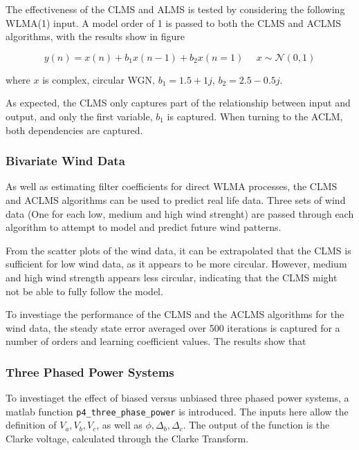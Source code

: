 \documentclass[main.tex]{subfiles}
\begin{document}
The effectiveness of the CLMS and ALMS is tested by considering the following WLMA(1) input. A model order of 1 is passed to both the CLMS and ACLMS algorithms, with the results show in figure %

\begin{equation}
y(n) = x(n) + b_1x(n-1) + b_2x(n=1)\ \ \ \ \ \ x \sim \mathcal{N}(0,1)
\end{equation}

where $x$ is complex, circular WGN, $b_1 = 1.5+1j$, $b_2  = 2.5-0.5j$.


As expected, the CLMS only captures part of the relationship between input and output, and only the first variable, $b_1$ is captured. When turning to the ACLM, both dependencies are captured.

\subsubsection{Bivariate Wind Data}

As well as estimating filter coefficients for direct WLMA processes, the CLMS and ACLMS algorithms can be used to predict real life data. Three sets of wind data (One for each low, medium and high wind strenght) are passed through each algorithm to attempt to model and predict future wind patterns.


From the scatter plots of the wind data, it can be extrapolated that the CLMS is sufficient for low wind data, as it appears to be more circular. However, medium and high wind strength appears less circular, indicating that the CLMS might not be able to fully follow the model. 

To investiage the performance of the CLMS and the ACLMS algorithms for the wind data, the steady state error averaged over 500 iterations is captured for a number of orders and learning coefficient values. The results show that %





\subsubsection{Three Phased Power Systems}

To investiaget the effect of biased versus unbiased three phased power systems, a matlab function {\tt p4\_three\_phase\_power} is introduced. The inputs here allow the definition of $V_a, V_b, V_c$, as well as $\phi, \Delta_b, \Delta_c$. The output of the function is the Clarke voltage, calculated through the Clarke Transform.  
\end{document}
